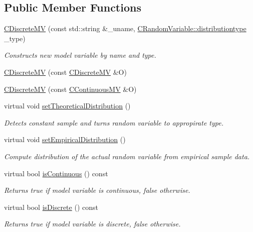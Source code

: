 \subsection*{Public Member Functions}
\begin{DoxyCompactItemize}
\item 
\hyperlink{class_go_s_u_m_1_1_c_discrete_m_v_aebbd9c3c4eae64d5ad99d8ea971d9c1e}{C\-Discrete\-M\-V} (const std\-::string \&\-\_\-uname, \hyperlink{class_c_random_variable_a80d2a87c43847274138b51f7d713d7f1}{C\-Random\-Variable\-::distributiontype} \-\_\-type)
\begin{DoxyCompactList}\small\item\em Constructs new model variable by name and type. \end{DoxyCompactList}\item 
\hyperlink{class_go_s_u_m_1_1_c_discrete_m_v_af7c40a5c6e0a54ae098e7c57e42ca64e}{C\-Discrete\-M\-V} (const \hyperlink{class_go_s_u_m_1_1_c_discrete_m_v}{C\-Discrete\-M\-V} \&O)
\item 
\hyperlink{class_go_s_u_m_1_1_c_discrete_m_v_a301a60a63864ffad50583b774e23b07b}{C\-Discrete\-M\-V} (const \hyperlink{class_go_s_u_m_1_1_c_continuous_m_v}{C\-Continuous\-M\-V} \&O)
\item 
virtual void \hyperlink{class_go_s_u_m_1_1_c_discrete_m_v_a1061fb0a466b852ffeb111238b702b39}{set\-Theoretical\-Distribution} ()
\begin{DoxyCompactList}\small\item\em Detects constant sample and turns random variable to appropirate type. \end{DoxyCompactList}\item 
virtual void \hyperlink{class_go_s_u_m_1_1_c_discrete_m_v_a7dd5ab7ac4922cdb2682012c942e1f10}{set\-Empirical\-Distribution} ()
\begin{DoxyCompactList}\small\item\em Compute distribution of the actual random variable from empirical sample data. \end{DoxyCompactList}\item 
virtual bool \hyperlink{class_go_s_u_m_1_1_c_discrete_m_v_a6366f6f6fd00242942b733ef5715592e}{is\-Continuous} () const 
\begin{DoxyCompactList}\small\item\em Returns true if model variable is continuous, false otherwise. \end{DoxyCompactList}\item 
virtual bool \hyperlink{class_go_s_u_m_1_1_c_discrete_m_v_ad9da78f518019e7133440189803f9cad}{is\-Discrete} () const 
\begin{DoxyCompactList}\small\item\em Returns true if model variable is discrete, false otherwise. \end{DoxyCompactList}\end{DoxyCompactItemize}
